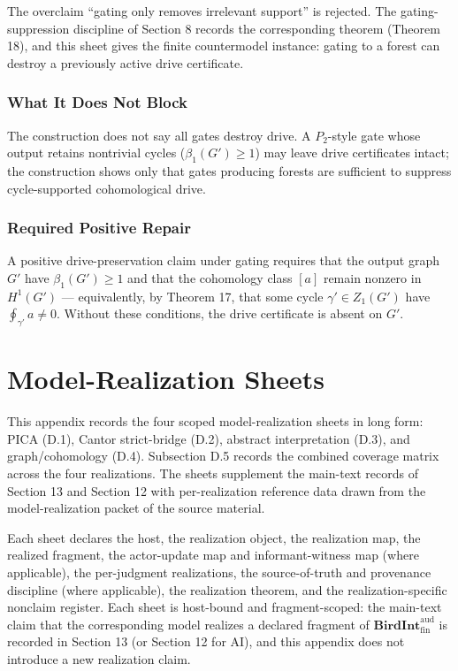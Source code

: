 \documentclass[11pt]{article}
\theoremstyle{definition}
\begin{document}
The overclaim ``gating only removes irrelevant support'' is rejected. The gating-suppression discipline of Section 8 records the corresponding theorem (Theorem 18), and this sheet gives the finite countermodel instance: gating to a forest can destroy a previously active drive certificate.

\subsubsection{What It Does Not Block}

The construction does not say all gates destroy drive. A \(P_2\)-style gate whose output retains nontrivial cycles (\(\beta_1(G')\ge 1\)) may leave drive certificates intact; the construction shows only that gates producing forests are sufficient to suppress cycle-supported cohomological drive.

\subsubsection{Required Positive Repair}

A positive drive-preservation claim under gating requires that the output graph \(G'\) have \(\beta_1(G')\ge 1\) and that the cohomology class \([a]\) remain nonzero in \(H^1(G')\) --- equivalently, by Theorem 17, that some cycle \(\gamma'\in Z_1(G')\) have \(\oint_{\gamma'}a\neq 0\). Without these conditions, the drive certificate is absent on \(G'\).
 \section{Model-Realization Sheets}

This appendix records the four scoped model-realization sheets in long form: PICA (D.1), Cantor strict-bridge (D.2), abstract interpretation (D.3), and graph/cohomology (D.4). Subsection D.5 records the combined coverage matrix across the four realizations. The sheets supplement the main-text records of Section 13 and Section 12 with per-realization reference data drawn from the model-realization packet of the source material.

Each sheet declares the host, the realization object, the realization map, the realized fragment, the actor-update map and informant-witness map (where applicable), the per-judgment realizations, the source-of-truth and provenance discipline (where applicable), the realization theorem, and the realization-specific nonclaim register. Each sheet is host-bound and fragment-scoped: the main-text claim that the corresponding model realizes a declared fragment of \(\mathbf{BirdInt}^{\mathrm{aud}}_{\mathrm{fin}}\) is recorded in Section 13 (or Section 12 for AI), and this appendix does not introduce a new realization claim.
\end{document}
